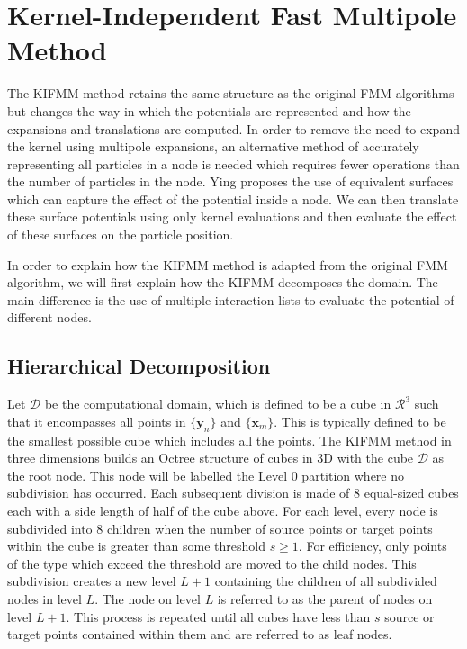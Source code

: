 \FloatBarrier
\section{Kernel-Independent Fast Multipole Method}\label{sec:KIFMM}

The KIFMM method retains the same structure as the original FMM algorithms but changes the way in which the potentials are represented and how the expansions and translations are computed. In order to remove the need to expand the kernel using multipole expansions, an alternative method of accurately representing all particles in a node is needed which requires fewer operations than the number of particles in the node. Ying \cite{Ying2004} proposes the use of equivalent surfaces which can capture the effect of the potential inside a node. We can then translate these surface potentials using only kernel evaluations and then evaluate the effect of these surfaces on the particle position.

In order to explain how the KIFMM method is adapted from the original FMM algorithm, we will first explain how the KIFMM decomposes the domain. The main difference is the use of multiple interaction lists to evaluate the potential of different nodes. 

\subsection{Hierarchical Decomposition}
Let $\mathcal{D}$ be the computational domain, which is defined to be a cube in $\mathcal{R}^3$ such that it encompasses all points in $\{\bm{y}_n\}$ and $\{\bm{x}_m\}$. This is typically defined to be the smallest possible cube which includes all the points. The KIFMM method in three dimensions builds an Octree structure of cubes in 3D with the cube $\mathcal{D}$ as the root node. This node will be labelled the Level $0$ partition where no subdivision has occurred. Each subsequent division is made of $8$ equal-sized cubes each with a side length of half of the cube above. For each level, every node is subdivided into $8$ children when the number of source points or target points within the cube is greater than some threshold $s\geq 1$. For efficiency, only points of the type which exceed the threshold are moved to the child nodes. This subdivision creates a new level $L+1$ containing the children of all subdivided nodes in level $L$. The node on level $L$ is referred to as the parent of nodes on level $L+1$. This process is repeated until all cubes have less than $s$ source or target points contained within them and are referred to as leaf nodes.

